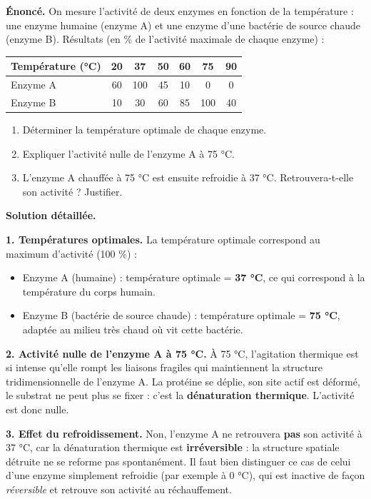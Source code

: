 \documentclass[11pt]{article}
\begin{document}
\begin{exoresolu}
\textbf{Énoncé.} On mesure l'activité de deux enzymes en fonction de la température : une enzyme humaine (enzyme A) et une enzyme d'une bactérie de source chaude (enzyme B). Résultats (en \% de l'activité maximale de chaque enzyme) :

\begin{center}
\begin{tabular}{|l|c|c|c|c|c|c|}
\hline
\rowcolor{popblueL} Température (°C) & 20 & 37 & 50 & 60 & 75 & 90 \\
\hline
Enzyme A & 60 & 100 & 45 & 10 & 0 & 0 \\
\hline
Enzyme B & 10 & 30 & 60 & 85 & 100 & 40 \\
\hline
\end{tabular}
\end{center}

\begin{enumerate}
\item Déterminer la température optimale de chaque enzyme.
\item Expliquer l'activité nulle de l'enzyme A à 75 °C.
\item L'enzyme A chauffée à 75 °C est ensuite refroidie à 37 °C. Retrouvera-t-elle son activité ? Justifier.
\end{enumerate}

\tcblower
\textbf{Solution détaillée.}

\textbf{1. Températures optimales.} La température optimale correspond au maximum d'activité (100 \%) :
\begin{itemize}
\item Enzyme A (humaine) : température optimale = \textbf{37 °C}, ce qui correspond à la température du corps humain.
\item Enzyme B (bactérie de source chaude) : température optimale = \textbf{75 °C}, adaptée au milieu très chaud où vit cette bactérie.
\end{itemize}

\textbf{2. Activité nulle de l'enzyme A à 75 °C.} À 75 °C, l'agitation thermique est si intense qu'elle rompt les liaisons fragiles qui maintiennent la structure tridimensionnelle de l'enzyme A. La protéine se déplie, son site actif est déformé, le substrat ne peut plus se fixer : c'est la \textbf{dénaturation thermique}. L'activité est donc nulle.

\textbf{3. Effet du refroidissement.} Non, l'enzyme A ne retrouvera \textbf{pas} son activité à 37 °C, car la dénaturation thermique est \textbf{irréversible} : la structure spatiale détruite ne se reforme pas spontanément. Il faut bien distinguer ce cas de celui d'une enzyme simplement refroidie (par exemple à 0 °C), qui est inactive de façon \emph{réversible} et retrouve son activité au réchauffement.
\end{exoresolu}
\end{document}
